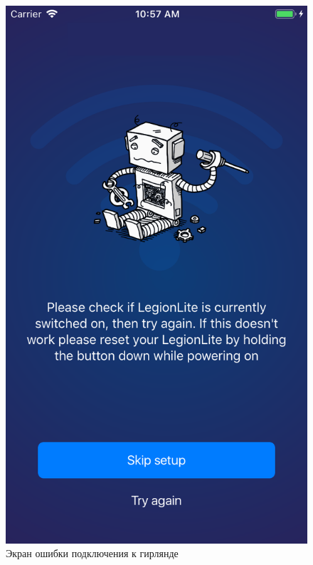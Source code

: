 ~
\begin{figure}[H]
\centering
	\includegraphics[scale=0.2]{figures/userGuide/failedLoading.png}
	\caption{Экран ошибки подключения к гирлянде}
	\label{fig:develop:userGuide:failedLoading}
\end{figure}
~
